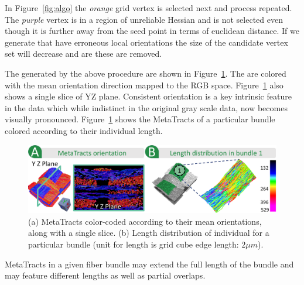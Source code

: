 In Figure~\ref{fig:algo} the \textit{orange} grid vertex is selected next and process repeated. The \textit{purple} vertex is in a region of unreliable Hessian and is not selected even though it is further away from the seed point in terms of euclidean distance. If we generate \mt that have erroneous local orientations the size of the candidate vertex set will decrease and are these are removed.

The \mt generated by the above procedure are shown in Figure~\ref{fig:length_distribution}. The \mt are colored with the mean orientation direction mapped to the RGB space. Figure~\ref{fig:length_distribution} also shows a single slice of YZ plane. Consistent orientation is a key intrinsic feature in the data which while indistinct in the original gray scale data, now becomes visually pronounced.
Figure~\ref{fig:length_distribution} shows the MetaTracts of a particular bundle colored according to their individual length.
\begin{figure}[htb]
\centering
	\includegraphics[width=\linewidth]{images/figure5.eps}
	\caption{(a) MetaTracts color-coded according to their mean orientations, along with a single slice. (b) Length distribution of individual \mt for a particular bundle (unit for length is grid cube edge length:  $2\mu m$).}
	\label{fig:length_distribution}
\end{figure}
MetaTracts in a given fiber bundle may extend the full length of the bundle and may feature different lengths as well as partial overlaps.
